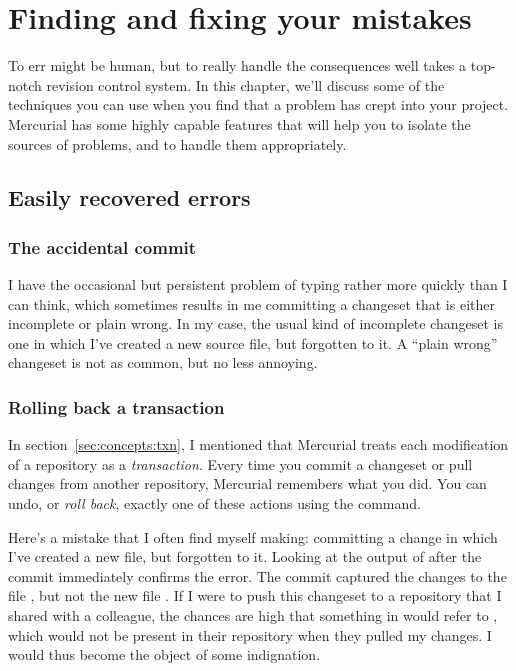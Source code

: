 \chapter{Finding and fixing your mistakes}
\label{chap:undo}

To err might be human, but to really handle the consequences well
takes a top-notch revision control system.  In this chapter, we'll
discuss some of the techniques you can use when you find that a
problem has crept into your project.  Mercurial has some highly
capable features that will help you to isolate the sources of
problems, and to handle them appropriately.

\section{Easily recovered errors}

\subsection{The accidental commit}

I have the occasional but persistent problem of typing rather more
quickly than I can think, which sometimes results in me committing a
changeset that is either incomplete or plain wrong.  In my case, the
usual kind of incomplete changeset is one in which I've created a new
source file, but forgotten to  it.  A ``plain wrong''
changeset is not as common, but no less annoying.

\subsection{Rolling back a transaction}

In section~\ref{sec:concepts:txn}, I mentioned that Mercurial treats
each modification of a repository as a \emph{transaction}.  Every time
you commit a changeset or pull changes from another repository,
Mercurial remembers what you did.  You can undo, or \emph{roll back},
exactly one of these actions using the  command.

Here's a mistake that I often find myself making: committing a change
in which I've created a new file, but forgotten to  it.
Looking at the output of  after the commit immediately
confirms the error.
The commit captured the changes to the file , but not the
new file .  If I were to push this changeset to a
repository that I shared with a colleague, the chances are high that
something in  would refer to , which would not
be present in their repository when they pulled my changes.  I would
thus become the object of some indignation.

